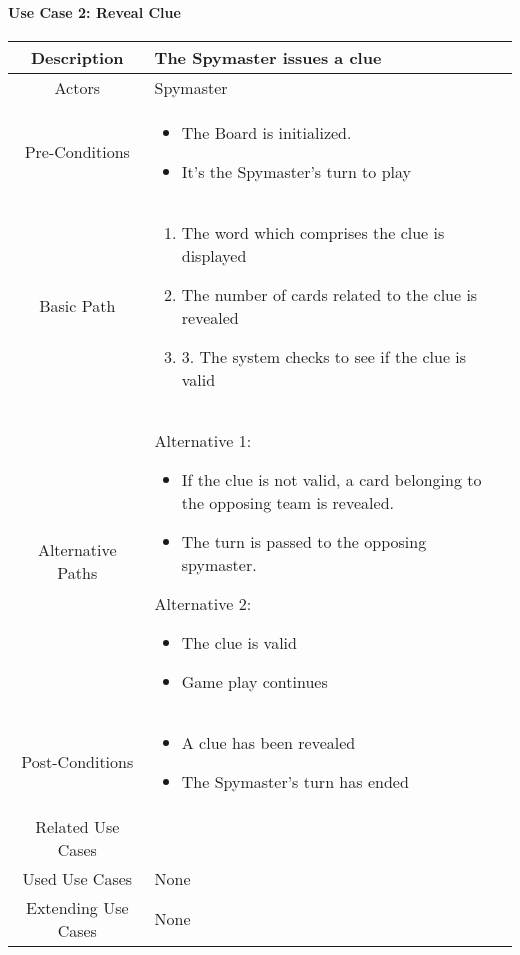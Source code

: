 \documentclass[10pt, a4paper]{article}
\begin{document}
	
	\paragraph{Use Case 2: Reveal Clue}
		\begin{center}
		\begin{tabular}{ |c|p{7cm}| } 
			\hline
			Description & The Spymaster issues a clue \\ 
			\hline
			Actors & Spymaster \\
			\hline 
			Pre-Conditions & \begin{itemize}
				\item The Board is initialized.
				\item It's the Spymaster's turn to play  
			\end{itemize} \\
			\hline
			Basic Path & 
				\begin{enumerate}
					\item The word which comprises the clue is displayed 
					\item The number of cards related to the clue is revealed
					\item 3.	The system checks to see if the clue is valid 
				\end{enumerate} \\
			\hline 
			Alternative Paths & Alternative 1: \begin{itemize}
				\item If the clue is not valid, a card belonging to the opposing team is revealed. 
				\item The turn is passed to the opposing spymaster.
			\end{itemize}
	
			Alternative 2:
			\begin{itemize}
			\item	The clue is valid
			\item 	Game play continues 
			\end{itemize}
			 \\
			\hline 
			Post-Conditions & 
				\begin{itemize}
					\item A clue has been revealed
					\item The Spymaster’s turn has ended 
				\end{itemize} \\
			\hline 
			Related Use Cases & \\
			\hline 
			Used Use Cases & None \\
			\hline
			Extending Use Cases & None \\
			\hline
		\end{tabular}
	\end{center}
		
\end{document}
